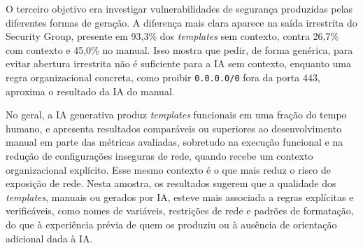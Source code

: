 O terceiro objetivo era investigar vulnerabilidades de segurança produzidas pelas diferentes formas de geração. A diferença mais clara aparece na saída irrestrita do Security Group, presente em 93,3\% dos \textit{templates} sem contexto, contra 26,7\% com contexto e 45,0\% no manual. Isso mostra que pedir, de forma genérica, para evitar abertura irrestrita não é suficiente para a IA sem contexto, enquanto uma regra organizacional concreta, como proibir \texttt{0.0.0.0/0} fora da porta 443, aproxima o resultado da IA do manual.

No geral, a IA generativa produz \textit{templates} funcionais em uma fração do tempo humano, e apresenta resultados comparáveis ou superiores ao desenvolvimento manual em parte das métricas avaliadas, sobretudo na execução funcional e na redução de configurações inseguras de rede, quando recebe um contexto organizacional explícito. Esse mesmo contexto é o que mais reduz o risco de exposição de rede. Nesta amostra, os resultados sugerem que a qualidade dos \textit{templates}, manuais ou gerados por IA, esteve mais associada a regras explícitas e verificáveis, como nomes de variáveis, restrições de rede e padrões de formatação, do que à experiência prévia de quem os produziu ou à ausência de orientação adicional dada à IA.
